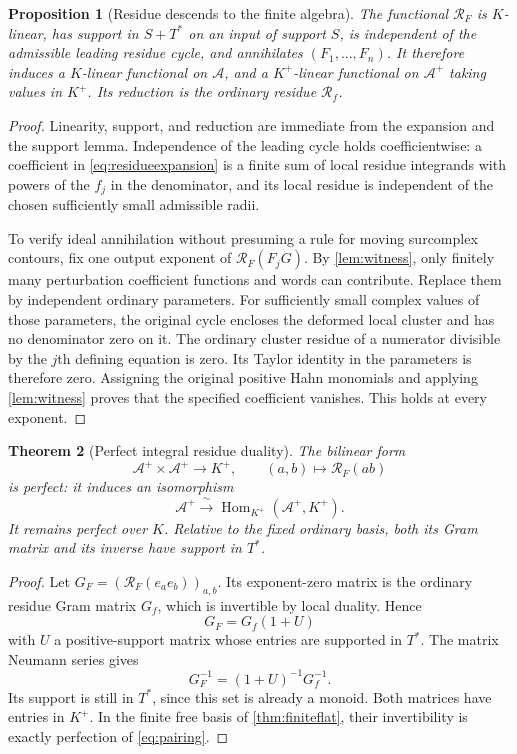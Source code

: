 \documentclass[11pt,letterpaper]{article}
\newtheorem{theorem}{Theorem}[section]
\newtheorem{proposition}[theorem]{Proposition}
\theoremstyle{definition}
\theoremstyle{remark}
\newcommand{\Kp}{K^{+}}
\newcommand{\RR}{\mathcal R}
\begin{document}
\begin{proposition}[Residue descends to the finite algebra]\label{prop:resdescend}
The functional $\RR_F$ is $K$-linear, has support in $S+T^*$ on an input of support $S$, is independent of the admissible leading residue cycle, and annihilates $(F_1,\ldots,F_n)$. It therefore induces a $K$-linear functional on $\mathcal A$, and a $\Kp$-linear functional on $\mathcal A^+$ taking values in $\Kp$. Its reduction is the ordinary residue $\RR_f$.
\end{proposition}
\begin{proof}
Linearity, support, and reduction are immediate from the expansion and the support lemma. Independence of the leading cycle holds coefficientwise: a coefficient in \eqref{eq:residueexpansion} is a finite sum of local residue integrands with powers of the $f_j$ in the denominator, and its local residue is independent of the chosen sufficiently small admissible radii.

To verify ideal annihilation without presuming a rule for moving surcomplex contours, fix one output exponent of $\RR_F(F_jG)$. By \cref{lem:witness}, only finitely many perturbation coefficient functions and words can contribute. Replace them by independent ordinary parameters. For sufficiently small complex values of those parameters, the original cycle encloses the deformed local cluster and has no denominator zero on it. The ordinary cluster residue of a numerator divisible by the $j$th defining equation is zero. Its Taylor identity in the parameters is therefore zero. Assigning the original positive Hahn monomials and applying \cref{lem:witness} proves that the specified coefficient vanishes. This holds at every exponent.
\end{proof}

\begin{theorem}[Perfect integral residue duality]\label{thm:duality}
The bilinear form
\begin{equation}\label{eq:pairing}
 \mathcal A^+\times\mathcal A^+\longrightarrow\Kp,
 \qquad (a,b)\longmapsto\RR_F(ab)
\end{equation}
is perfect: it induces an isomorphism
\[
 \mathcal A^+\xrightarrow{\ \sim\ }
     \operatorname{Hom}_{\Kp}(\mathcal A^+,\Kp).
\]
It remains perfect over $K$. Relative to the fixed ordinary basis, both its Gram matrix and its inverse have support in $T^*$.
\end{theorem}
\begin{proof}
Let $G_F=(\RR_F(e_ae_b))_{a,b}$. Its exponent-zero matrix is the ordinary residue Gram matrix $G_f$, which is invertible by local duality. Hence
\[
 G_F=G_f(1+U)
\]
with $U$ a positive-support matrix whose entries are supported in $T^*$. The matrix Neumann series gives
\[
 G_F^{-1}=(1+U)^{-1}G_f^{-1}.
\]
Its support is still in $T^*$, since this set is already a monoid. Both matrices have entries in $\Kp$. In the finite free basis of \cref{thm:finiteflat}, their invertibility is exactly perfection of \eqref{eq:pairing}.
\end{proof}
\end{document}
